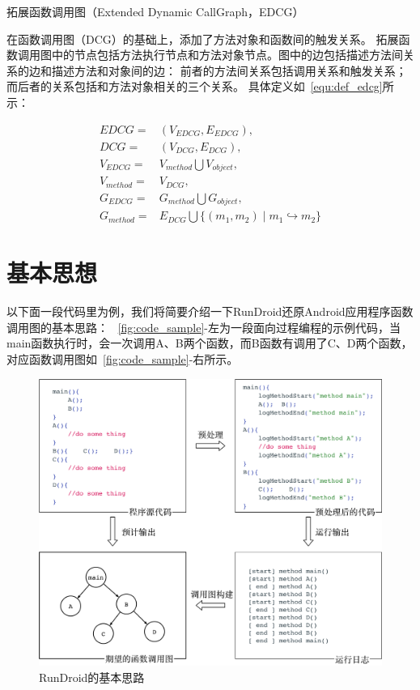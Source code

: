 \begin{myDef}
	拓展函数调用图（Extended Dynamic CallGraph，EDCG）
\end{myDef}
	在函数调用图（DCG）的基础上，添加了方法对象和函数间的触发关系。
	拓展函数调用图中的节点包括方法执行节点和方法对象节点。图中的边包括描述方法间关系的边和描述方法和对象间的边：
	前者的方法间关系包括调用关系和触发关系；而后者的关系包括和方法对象相关的三个关系。
	具体定义如~\autoref{equ:def_edcg}所示：
	
	\begin{equation}
	\begin{aligned}
	EDCG = & (V_{EDCG},E_{EDCG}) ,\\ 
	DCG = & (V_{DCG},E_{DCG}) ,\\ 
	V_{EDCG} = & V_{method} \bigcup V_{object} ,\\
	V_{method} = & V_{DCG}, \\ 
	G_{EDCG} = & G_{method} \bigcup G_{object} , \\
	G_{method} = & E_{DCG} \bigcup \{ (m_1 , m_2) \mid m_1 \hookrightarrow m_2 \}
	\end{aligned}
	\label{equ:def_edcg} 
	\end{equation}
	

\section{基本思想}
以下面一段代码里为例，我们将简要介绍一下RunDroid还原Android应用程序函数调用图的基本思路：
~\autoref{fig:code_sample}-左为一段面向过程编程的示例代码，当main函数执行时，会一次调用A、B两个函数，而B函数有调用了C、D两个函数，
对应函数调用图如~\autoref{fig:code_sample}-右所示。


\begin{figure}[h]
	\centering
	\includegraphics[width=\textwidth]{./Figures/code-sample.png}
	\caption{RunDroid的基本思路}
	\label{fig:code_sample}
\end{figure}


